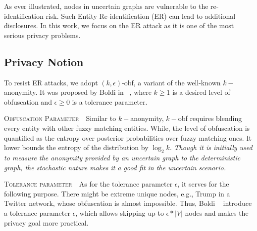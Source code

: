 As ever illustrated, nodes in uncertain graphs are vulnerable to the re-identification risk. Such Entity Re-identification (ER) can lead to additional disclosures. In this work, we focus on the ER attack as it is one of the most serious privacy problems. 
\subsection{Privacy Notion}
\label{sec:privacyNotion}
To resist ER attacks, we adopt $(k,\epsilon)$-obf, a variant of the well-known $k-$anonymity. It was proposed by Boldi {\etal} in ~\cite{Boldi_Injecting_2012}, where $k \ge 1$ is a desired level of obfuscation and $\epsilon \ge 0$ is a tolerance parameter. 

\textsc{Obfuscation Parameter}~~Similar to $k-$anonymity, $k-$obf requires blending every entity with other fuzzy matching entities. While, the level of obfuscation is quantified as the entropy over posterior probabilities over fuzzy matching ones. It lower bounds the entropy of the distribution by $\log_{2} k$. 
\emph{Though it is initially used to measure the anonymity provided by an uncertain graph to the deterministic graph, the stochastic nature makes it a good fit in the uncertain scenario.} 

\textsc{Tolerance parameter}~~As for the tolerance parameter $\epsilon$, it serves for the following purpose. There might be extreme unique nodes, e.g., Trump in a Twitter network, whose obfuscation is almost impossible. Thus, Boldi {\etal}~\cite{Boldi_Injecting_2012} introduce a tolerance parameter $\epsilon$, which allows skipping up to $\epsilon * |V|$ nodes and makes the privacy goal more practical. 
